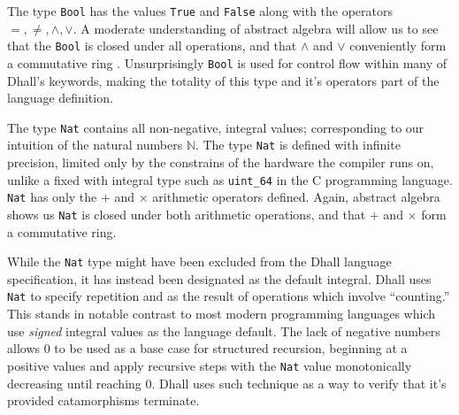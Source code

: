 \documentclass[12pt]{diazessay}
\newcommand{\Bool   }{\texttt{Bool}}
\newcommand{\Nat    }{\texttt{Nat}}
\begin{document}
The type \Bool{} has the values \texttt{True} and \texttt{False} along with the operators $=, \ne, \land, \lor$.
A moderate understanding of abstract algebra will allow us to see that the \Bool{} is closed under all operations, and that $\land$ and $\lor$ conveniently form a commutative ring \cite{noether1921idealtheorie}.
Unsurprisingly \Bool{} is used for control flow within many of Dhall's keywords, making the totality of this type and it's operators part of the language definition.

The type \Nat{} contains all non-negative, integral values; corresponding to our intuition of the natural numbers $\mathbb{N}$.
The type \Nat{} is defined with infinite precision, limited only by the constrains of the hardware the compiler runs on, unlike a fixed with integral type such as \texttt{uint\_64} in the C programming language.
\Nat{} has only the $+$ and $\times$ arithmetic operators defined.
Again, abstract algebra shows us \Nat{} is closed under both arithmetic operations, and that $+$ and $\times$ form a commutative ring.

While the \Nat{} type might have been excluded from the Dhall language specification, it has instead been designated as the default integral.
Dhall uses \Nat{} to specify repetition and as the result of operations which involve ``counting.'' This stands in notable contrast to most modern programming languages which use \emph{signed} integral values as the language default.
The lack of negative numbers allows $0$ to be used as a base case for structured recursion, beginning at a positive values and apply recursive steps with the \Nat{} value monotonically decreasing until reaching $0$.
Dhall uses such technique as a way to verify that it's provided catamorphisms terminate.
\end{document}
